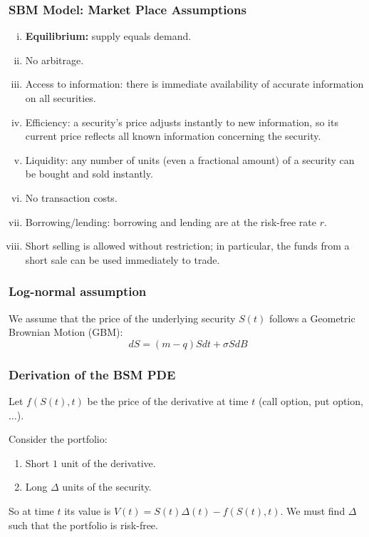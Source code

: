 \subsubsection{SBM Model: Market Place Assumptions}
\begin{enumerate}[i.]
    \item \textbf{Equilibrium: } supply equals demand.
    \item No arbitrage.
    \item Access to information: there is immediate availability of accurate information on all securities.
    \item Efficiency: a security's price adjusts instantly to new information, so its current price reflects all known information concerning the security.
    \item Liquidity: any number of units (even a fractional amount) of a security can be bought and sold instantly.
    \item No transaction costs.
    \item Borrowing/lending: borrowing and lending are at the risk-free rate \(r\).
    \item Short selling is allowed without restriction; in particular, the funds from a short sale can be used immediately to trade.
\end{enumerate}

\subsubsection{Log-normal assumption}
We assume that the price of the underlying security \(S(t)\) follows a Geometric Brownian Motion (GBM):
\begin{equation*}
    dS = (m-q)S dt + \sigma SdB
\end{equation*}

\subsubsection{Derivation of the BSM PDE}
Let \(f(S(t),t)\) be the price of the derivative at time \(t\) (call option, put option, \(\dots\)).

Consider the portfolio:
\begin{enumerate}
    \item Short \(1\) unit of the derivative.
    \item Long \(\Delta\) units of the security.
\end{enumerate}
So at time \(t\) its value is \(V(t) = S(t)\Delta(t) - f(S(t),t)\). We must find \(\Delta\) such that the portfolio is risk-free.

